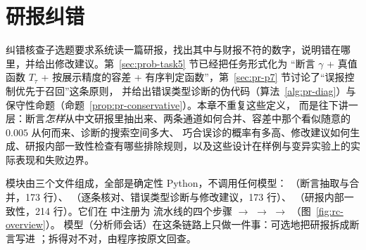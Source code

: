 \section{研报纠错}
\label{sec:reportcheck}

纠错核查子选题要求系统读一篇研报，找出其中与财报不符的数字，说明错在哪里，并给出修改建议。第~\ref{sec:prob-task5} 节已经把任务形式化为
“断言 $\gamma$ + 真值函数 $T_\tau$ + 按展示精度的容差 + 有序判定函数”，第~\ref{sec:pr-p7} 节讨论了“误报控制优先于召回”这条原则，
并给出错误类型诊断的伪代码（算法~\ref{alg:pr-diag}）与保守性命题（命题~\ref{prop:pr-conservative}）。本章不重复这些定义，
而是往下讲一层：断言\emph{怎样}从中文研报里抽出来、两条通道如何合并、容差中那个看似随意的 $0.005$ 从何而来、诊断的搜索空间多大、
巧合误诊的概率有多高、修改建议如何生成、研报内部一致性检查有哪些排除规则，以及这些设计在样例与变异实验上的实际表现和失败边界。

\begin{sloppypar}
模块由三个文件组成，全部是确定性 Python，不调用任何模型：
（断言抽取与合并，173 行）、
（逐条核对、错误类型诊断与修改建议，173 行）、
（研报内部一致性，214 行）。它们在  中注册为  流水线的四个步骤
 $\to$  $\to$  $\to$ （图~\ref{fig:rc-overview}）。
模型（分析师会话）在这条链路上只做一件事：可选地把研报拆成断言写进 ；拆得对不对，由程序按原文回查。
\end{sloppypar}

